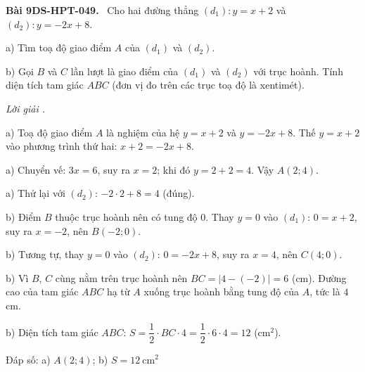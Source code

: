 \documentclass[12pt,a4paper]{article}
\newenvironment{problem}[1][]{\par\medskip\noindent\textbf{Bài #1.}\ }{\par}
\newenvironment{solution}[1][]{\par\noindent\textit{Lời giải #1.}\par}{\par}
\begin{document}
\begin{problem}[9DS-HPT-049]
Cho hai đường thẳng $(d_1)\colon y = x + 2$ và $(d_2)\colon y = -2x + 8$.

a) Tìm toạ độ giao điểm $A$ của $(d_1)$ và $(d_2)$.

b) Gọi $B$ và $C$ lần lượt là giao điểm của $(d_1)$ và $(d_2)$ với trục hoành. Tính diện tích tam giác $ABC$ (đơn vị đo trên các trục toạ độ là xentimét).

\begin{solution}
a) Toạ độ giao điểm $A$ là nghiệm của hệ $y = x + 2$ và $y = -2x + 8$. Thế $y = x + 2$ vào phương trình thứ hai: $x + 2 = -2x + 8$.

a) Chuyển vế: $3x = 6$, suy ra $x = 2$; khi đó $y = 2 + 2 = 4$. Vậy $A(2; 4)$.

a) Thử lại với $(d_2)$: $-2 \cdot 2 + 8 = 4$ (đúng).

b) Điểm $B$ thuộc trục hoành nên có tung độ $0$. Thay $y = 0$ vào $(d_1)$: $0 = x + 2$, suy ra $x = -2$, nên $B(-2; 0)$.

b) Tương tự, thay $y = 0$ vào $(d_2)$: $0 = -2x + 8$, suy ra $x = 4$, nên $C(4; 0)$.

b) Vì $B$, $C$ cùng nằm trên trục hoành nên $BC = |4 - (-2)| = 6$ (cm). Đường cao của tam giác $ABC$ hạ từ $A$ xuống trục hoành bằng tung độ của $A$, tức là $4$ cm.

b) Diện tích tam giác $ABC$: $S = \dfrac{1}{2} \cdot BC \cdot 4 = \dfrac{1}{2} \cdot 6 \cdot 4 = 12$ (cm$^2$).

Đáp số: a) $\boxed{A(2; 4)}$; b) $\boxed{S = 12\ \text{cm}^2}$
\end{solution}
\end{problem}
\end{document}
